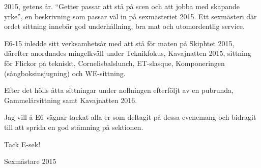 \documentclass[../_main/handlingar.tex]{subfiles}
\begin{document}

2015, getens år. ``Getter passar att stå på scen och att jobba med skapande yrke'', en beskrivning som passar väl in på sexmästeriet 2015. Ett sexmästeri där ordet sittning innebär god underhållning, bra mat och utomordentlig service.

E6-15 inledde sitt verksamhetsår med att stå för maten på Skiphtet 2015, därefter anordnades mingelkväll under Teknikfokus, Kavajnatten 2015, sittning för Flickor på tekniskt, Cornelisbalslunch, ET-slasque, Komponeringen (sångboksinsjugning) och WE-sittning.

Efter det hölls åtta sittningar under nollningen efterföljt av en pubrunda, Gammelårsittning samt Kavajnatten 2016.

Jag vill å E6 vägnar tackat alla er som deltagit på dessa evenemang och bidragit till att sprida en god stämning på sektionen.

Tack E-sek!

\begin{signatures}{1}
    \mvh
    \signature{Adam Waks}{Sexmästare 2015}
\end{signatures}
\end{document}
